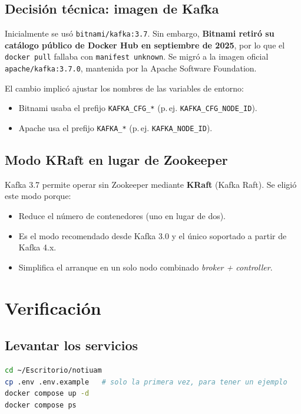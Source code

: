 \subsection{Decisión técnica: imagen de Kafka}

\begin{aviso}
Inicialmente se usó \texttt{bitnami/kafka:3.7}. Sin embargo, \textbf{Bitnami retiró su catálogo público de Docker Hub en septiembre de 2025}, por lo que el \texttt{docker pull} fallaba con \texttt{manifest unknown}. Se migró a la imagen oficial \texttt{apache/kafka:3.7.0}, mantenida por la Apache Software Foundation.

El cambio implicó ajustar los nombres de las variables de entorno:
\begin{itemize}[leftmargin=*]
  \item Bitnami usaba el prefijo \texttt{KAFKA\_CFG\_*} (p.\,ej. \texttt{KAFKA\_CFG\_NODE\_ID}).
  \item Apache usa el prefijo \texttt{KAFKA\_*} (p.\,ej. \texttt{KAFKA\_NODE\_ID}).
\end{itemize}
\end{aviso}

\subsection{Modo KRaft en lugar de Zookeeper}

Kafka 3.7 permite operar sin Zookeeper mediante \textbf{KRaft} (Kafka Raft). Se eligió este modo porque:
\begin{itemize}[leftmargin=*]
  \item Reduce el número de contenedores (uno en lugar de dos).
  \item Es el modo recomendado desde Kafka 3.0 y el único soportado a partir de Kafka 4.x.
  \item Simplifica el arranque en un solo nodo combinado \textit{broker + controller}.
\end{itemize}

\section{Verificación}

\subsection{Levantar los servicios}

\begin{lstlisting}[language=bash]
cd ~/Escritorio/notiuam
cp .env .env.example   # solo la primera vez, para tener un ejemplo
docker compose up -d
docker compose ps
\end{lstlisting}

